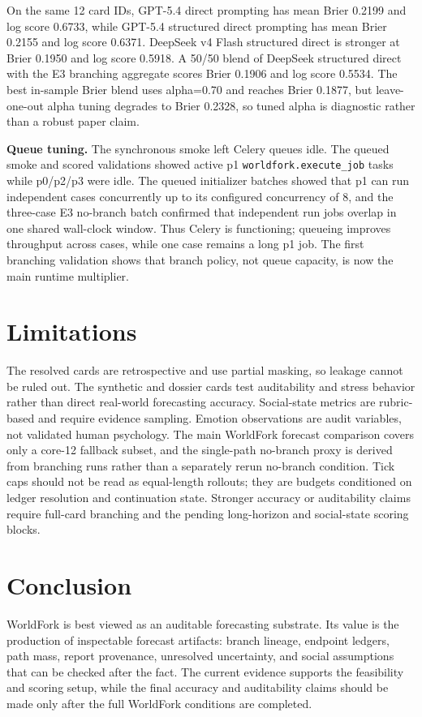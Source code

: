 \documentclass{article}
\begin{document}
On the same 12 card IDs, GPT-5.4 direct prompting has mean Brier 0.2199 and log score 0.6733, while GPT-5.4 structured direct prompting has mean Brier 0.2155 and log score 0.6371. DeepSeek v4 Flash structured direct is stronger at Brier 0.1950 and log score 0.5918. A 50/50 blend of DeepSeek structured direct with the E3 branching aggregate scores Brier 0.1906 and log score 0.5534. The best in-sample Brier blend uses alpha=0.70 and reaches Brier 0.1877, but leave-one-out alpha tuning degrades to Brier 0.2328, so tuned alpha is diagnostic rather than a robust paper claim.

\textbf{Queue tuning.} The synchronous smoke left Celery queues idle. The queued smoke and scored validations showed active p1 \texttt{worldfork.execute\_job} tasks while p0/p2/p3 were idle. The queued initializer batches showed that p1 can run independent cases concurrently up to its configured concurrency of 8, and the three-case E3 no-branch batch confirmed that independent run jobs overlap in one shared wall-clock window. Thus Celery is functioning; queueing improves throughput across cases, while one case remains a long p1 job. The first branching validation shows that branch policy, not queue capacity, is now the main runtime multiplier.

\section{Limitations}

The resolved cards are retrospective and use partial masking, so leakage cannot be ruled out. The synthetic and dossier cards test auditability and stress behavior rather than direct real-world forecasting accuracy. Social-state metrics are rubric-based and require evidence sampling. Emotion observations are audit variables, not validated human psychology. The main WorldFork forecast comparison covers only a core-12 fallback subset, and the single-path no-branch proxy is derived from branching runs rather than a separately rerun no-branch condition. Tick caps should not be read as equal-length rollouts; they are budgets conditioned on ledger resolution and continuation state. Stronger accuracy or auditability claims require full-card branching and the pending long-horizon and social-state scoring blocks.

\section{Conclusion}

WorldFork is best viewed as an auditable forecasting substrate. Its value is the production of inspectable forecast artifacts: branch lineage, endpoint ledgers, path mass, report provenance, unresolved uncertainty, and social assumptions that can be checked after the fact. The current evidence supports the feasibility and scoring setup, while the final accuracy and auditability claims should be made only after the full WorldFork conditions are completed.



\end{document}
